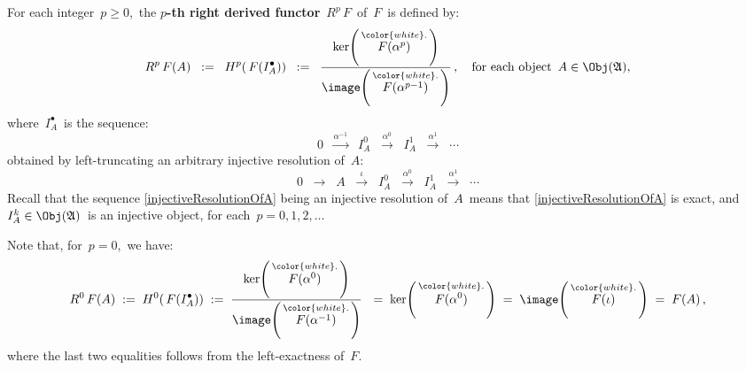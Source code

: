 \begin{itemize}
	For each integer \,$p \geq 0$,\, the \textbf{$p$-th right derived functor} \,$R^{p}\,F$\, of \,$F$\, is defined by:
	\begin{equation*}
	R^{p}\,F(A)
	\;\; := \;\;
		H^{p}\!\left(\,F(I_{A}^{\bullet})\right)
	\;\; := \;\;
		\dfrac{
			\ker\!\left(\,\overset{{\color{white}.}}{F(\alpha^{p})}\,\right)
		}{
			\image\!\left(\,\overset{{\color{white}.}}{F(\alpha^{p-1})}\,\right)
		}\,,
	\quad
	\textnormal{for each object \,$A \in \Obj(\mathfrak{A})$},
	\end{equation*}
	where \,$I_{A}^{\bullet}$\, is the sequence:\,
	\begin{equation*}
	0
	\;\;\overset{\alpha^{-1}}{\longrightarrow}\;\;
		I_{A}^{0}
	\;\;\overset{\alpha^{0}}{\longrightarrow}\;\;
		I_{A}^{1}
	\;\;\overset{\alpha^{1}}{\longrightarrow}\;\;
		\cdots
	\end{equation*}
	obtained by left-truncating an arbitrary injective resolution of \,$A$:\,
	\begin{equation}\label{injectiveResolutionOfA}
	0
	\;\;\longrightarrow\;\;
		A 
	\;\;\overset{\iota}{\longrightarrow}\;\;
		I_{A}^{0}
	\;\;\overset{\alpha^{0}}{\longrightarrow}\;\;
		I_{A}^{1}
	\;\;\overset{\alpha^{1}}{\longrightarrow}\;\;
		\cdots
	\end{equation}
	Recall that the sequence \eqref{injectiveResolutionOfA} being an injective resolution of \,$A$\,
	means that \eqref{injectiveResolutionOfA} is exact, and \,$I_{A}^{k} \in \Obj(\mathfrak{A})$\,
	is an injective object, for each \,$p = 0, 1, 2, \ldots$\,

	Note that, for \,$p = 0$,\, we have:
	\begin{equation*}
	R^{0}\,F(A)
	\; := \;
		H^{0}\!\left(\,F(I_{A}^{\bullet})\right)
	\; := \;
		\dfrac{
			\ker\!\left(\,\overset{{\color{white}.}}{F(\alpha^{0})}\,\right)
		}{
			\image\!\left(\,\overset{{\color{white}.}}{F(\alpha^{-1})}\,\right)
		}\
	\; = \;
		\ker\!\left(\,\overset{{\color{white}.}}{F(\alpha^{0})}\,\right)
	\; = \;
		\image\!\left(\,\overset{{\color{white}.}}{F(\iota)}\,\right)
	\; = \;
		F(A)\,,
	\end{equation*}
	where the last two equalities follows from the left-exactness of \,$F$.\,
	\vskip 0.3cm


\end{itemize}
